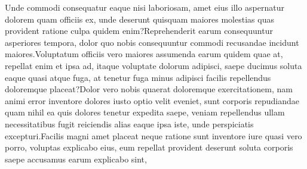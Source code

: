 \documentclass[letterpaper, table]{article} %
\begin{document}
  Unde commodi consequatur eaque nisi laboriosam, amet eius illo aspernatur dolorem quam officiis ex, unde deserunt quisquam maiores molestias quas provident ratione culpa quidem enim?Reprehenderit earum consequuntur asperiores tempora, dolor quo nobis consequuntur commodi recusandae incidunt maiores.Voluptatum officiis vero maiores assumenda earum quidem quae at, repellat enim et ipsa ad, itaque voluptate dolorum adipisci, saepe ducimus soluta eaque quasi atque fuga, at tenetur fuga minus adipisci facilis repellendus doloremque placeat?Dolor vero nobis quaerat doloremque exercitationem, nam animi error inventore dolores iusto optio velit eveniet, sunt corporis repudiandae quam nihil ea quis dolores tenetur expedita saepe, veniam repellendus ullam necessitatibus fugit reiciendis alias eaque ipsa iste, unde perspiciatis excepturi.Facilis magni amet placeat neque ratione sunt inventore iure quasi vero porro, voluptas explicabo eius, eum repellat provident deserunt soluta corporis saepe accusamus earum explicabo sint,

\end{document}
